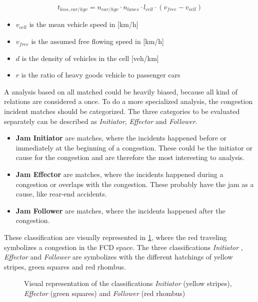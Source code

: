 \begin{equation}
	t_{loss,car/hgv} = n_{car/hgv} \cdot n_{lanes} \cdot l_{cell} \cdot ( v_{free} - v_{cell})
	\label{equation_timeloss}
\end{equation}
\begin{itemize}
	\setlength\itemsep{0.01em}	
	\item[] $v_{cell}$ is the mean vehicle speed in [km/h]
	\item[] $v_{free}$ is the assumed free flowing speed in [km/h]
	\item[] $d$ is the density of vehicles in the cell [veh/km]
	\item[] $r$ is the ratio of heavy goods vehicle to passenger cars 
\end{itemize}

\bigskip

A analysis based on all matched could be heavily biased, because all kind of relations are considered a once. To do a more specialized analysis, the congestion incident matches should be categorized. The three categories to be evaluated separately can be described as \textit{Initiator}, \textit{Effector} and \textit{Follower}.
\begin{itemize}
	\setlength\itemsep{0.1em}	
	\item[] \textbf{Jam Initiator} are matches, where the incidents happened before or immediately at the beginning of a congestion. These could be the initiator or cause for the congestion and are therefore the most interesting to analysis.
	\item[] \textbf{Jam Effector} are matches, where the incidents happened during a congestion or overlaps with the congestion. These probably have the jam as a cause, like rear-end accidents.
	\item[] \textbf{Jam Follower} are matches, where the incidents happened after the congestion. 
\end{itemize}

These classification are visually represented in \cref{img:jam_classifation}, where the red traveling symbolizes a congestion in the FCD space. The three classifications \textit{Initiator} , \textit{Effector}  and \textit{Follower}  are symbolizes with the different hatchings of yellow stripes, green squares and red rhombus.
\begin{figure}[ht]
	\centering	
	
	\vspace{-4mm}
	\caption{Visual representation of the classifications \textit{Initiator} (yellow stripes), \textit{Effector} (green squares) and \textit{Follower} (red rhombus)}
	\label{img:jam_classifation}
	\vspace{-4mm}
\end{figure}

